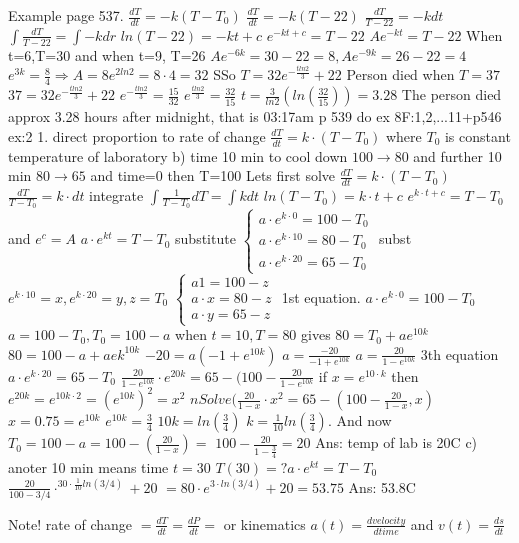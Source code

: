 \documentclass{article}
\begin{document}
Example page 537.
$\frac{dT}{dt}=-k(T-T_0)$
$\frac{dT}{dt}=-k(T-22)$
$\frac{dT}{T-22}=-kdt$
$\int\frac{dT}{T-22}=\int-kdr$
$ln(T-22)=-kt+c$
$e^{-kt+c}=T-22$
$Ae^{-kt}=T-22$
When t=6,T=30 and when t=9, T=26
$Ae^{-6k}=30-22=8, Ae^{-9k}=26-22=4$
$e^{3k}=\frac{8}{4}\Rightarrow A=8e^{2ln2}=8\cdot 4=32$
SSo $T=32e^{-\frac{tln2}{3}}+22$
Person died when $T=37$
$37=32e^{-\frac{tln2}{3}}+22$
$e^{-\frac{tln2}{3}}=\frac{15}{32}$
$e^{\frac{tln2}{3}}=\frac{32}{15}$
$t=\frac{3}{ln2}(ln(\frac{32}{15}))=3.28$
The person died approx 3.28 hours after midnight, that is 03:17am
p 539 do ex 8F:1,2,...11+p546 ex:2
1. direct proportion to rate of change
$\frac{dT}{dt}=k\cdot (T-T_0)$
where $T_0$ is constant temperature of laboratory
b) time 10 min to cool down $100\rightarrow 80$
and further 10 min $80\rightarrow 65$
and time=0 then T=100
Lets first solve $\frac{dT}{dt}=k\cdot(T-T_0)$
$\frac{dT}{T-T_0}=k\cdot dt$ integrate
$\int\frac{1}{T-T_0}dT=\int k dt$
$ln(T-T_0)=k\cdot t+c$
$e^{k\cdot t+c}=T-T_0$ and $e^{c}=A$
$a\cdot e^{kt}=T-T_0$ substitute
$\begin{cases}a\cdot e^{k\cdot 0}=100-T_0
\\ a\cdot e^{k\cdot 10}=80-T_0
\\ a\cdot e^{k\cdot 20}=65-T_0\end{cases}$
subst $e^{k\cdot 10}=x, e^{k\cdot 20}=y, z=T_0$
$\begin{cases}a1=100-z
\\ a\cdot x=80-z
\\ a\cdot y=65-z\end{cases}$
1st equation.
$a\cdot e^{k\cdot 0}=100-T_0$
$a=100-T_0, T_0=100-a$
when $t=10, T=80$ gives 
$80=T_0+ae^{10k}$
$80=100-a+aek^{10k}$
$-20=a(-1+e^{10k})$
$a=\frac{-20}{-1+e^{10k}}$
$a=\frac{20}{1-e^{10k}}$
3th equation $a\cdot e^{k\cdot20}=65-T_0$
$\frac{20}{1-e^{10k}}\cdot e^{20k}=65-(100-\frac{20}{1-e^{10k}}$
if $x=e^{10\cdot k}$ then $e^{20k}=e^{10k\cdot 2}=(e^{10k})^2=x^2$
$nSolve(\frac{20}{1-x}\cdot x^2=65-(100-\frac{20}{1-x},x)$
$x=0.75=e^{10k}$
$e^{10k}=\frac{3}{4}$
$10k=ln(\frac{3}{4})$
$k=\frac{1}{10}ln(\frac{3}{4})$.
And now $T_0=100-a=100-(\frac{20}{1-x})=$
$100-\frac{20}{1-\frac{3}{4}}=20$
Ans: temp of lab is 20C
c) anoter 10 min means time $t=30$
$T(30)=?     a\cdot e^{kt}=T-T_0$
$\frac{20}{100-3/4}\cdot^{30\cdot\frac{1}{10}ln(3/4)}+20$
$=80\cdot e^{3\cdot ln(3/4)}+20=53.75$
Ans: 53.8C

Note! rate of change $=\frac{dT}{dt}=\frac{dP}{dt}=$
or kinematics
$a(t)=\frac{dvelocity}{d time}$ and $v(t)=\frac{ds}{dt}$
\end{document}
